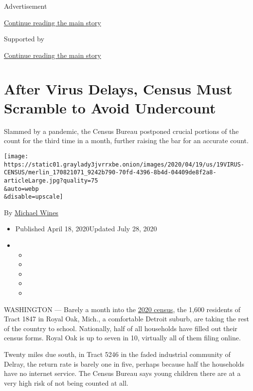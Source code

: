 Advertisement

\protect\hyperlink{after-top}{Continue reading the main story}

Supported by

\protect\hyperlink{after-sponsor}{Continue reading the main story}

\hypertarget{after-virus-delays-census-must-scramble-to-avoid-undercount}{%
\section{After Virus Delays, Census Must Scramble to Avoid
Undercount}\label{after-virus-delays-census-must-scramble-to-avoid-undercount}}

Slammed by a pandemic, the Census Bureau postponed crucial portions of
the count for the third time in a month, further raising the bar for an
accurate count.

\texttt{[image: https://static01.graylady3jvrrxbe.onion/images/2020/04/19/us/19VIRUS-CENSUS/merlin\_170821071\_9242b790-70fd-4396-8b4d-04409de8f2a8-articleLarge.jpg?quality=75\\\&auto=webp\\\&disable=upscale]}

By \href{https://www.nytimes3xbfgragh.onion/by/michael-wines}{Michael
Wines}

\begin{itemize}
\item
  Published April 18, 2020Updated July 28, 2020
\item
  \begin{itemize}
  \item
  \item
  \item
  \item
  \item
  \end{itemize}
\end{itemize}

WASHINGTON --- Barely a month into the
\href{https://www.nytimes3xbfgragh.onion/2020/07/28/us/trump-census.html}{2020
census}, the 1,600 residents of Tract 1847 in Royal Oak, Mich., a
comfortable Detroit suburb, are taking the rest of the country to
school. Nationally, half of all households have filled out their census
forms. Royal Oak is up to seven in 10, virtually all of them filing
online.

Twenty miles due south, in Tract 5246 in the faded industrial community
of Delray, the return rate is barely one in five, perhaps because half
the households have no internet service. The Census Bureau says young
children there are at a very high risk of not being counted at all.

